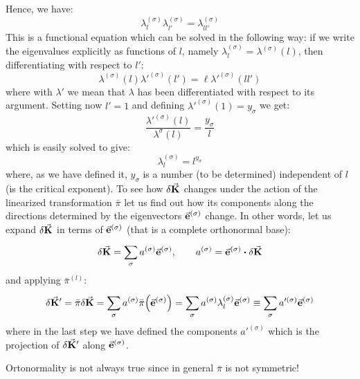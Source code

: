 \documentclass[../main/main.tex]{subfiles}
\begin{document}
Hence, we have:
\begin{equation}
  \lambda _l^{(\sigma )} \lambda _{l'}^{(\sigma )} =  \lambda _{ll'}^{(\sigma )}
  \label{eq:20_3}
\end{equation}
This is a functional equation which can be solved in the following way:  if we write the eigenvalues explicitly as functions of \( l \), namely \( \lambda _l^{(\sigma )}= \lambda^{(\sigma )}  (l)\), then differentiating with respect to \( l' \):
\begin{equation*}
   \lambda ^{(\sigma )}(l )\lambda '^{(\sigma )}(l')=\ell \lambda '^{(\sigma )}(l l ')
\end{equation*}
where with \( \lambda ' \)  we mean that \( \lambda  \)  has been differentiated with respect to its argument. Setting now \( l'=1 \)  and defining \( \lambda'^{(\sigma )} (1) = y_\sigma \)  we get:
\begin{equation*}
  \frac{\lambda'^{(\sigma )} (l)}{\lambda^\sigma (l)} = \frac{ y_\sigma}{l}
\end{equation*}
which is easily solved to give:
\begin{equation}
   \lambda _{l}^{(\sigma )} = l^{y_\sigma}
\end{equation}
where, as we have defined it, \( y_\sigma \) is a number (to be determined) independent of \( l \)  (is the critical exponent). To see how \( \delta \va{K} \) changes under the action of the linearized transformation  \( \bar{\pi }  \) let us find out how its components along the directions determined by the eigenvectors \( \va{e}^{(\sigma )} \) change.  In other words, let us expand \( \delta \va{K} \) in terms of \( \va{e}^{(\sigma )} \) (that is a complete orthonormal base):
\begin{equation}
  \delta \va{K} = \sum_{\sigma }^{} a^{(\sigma )} \va{e}^{(\sigma )}, \qquad a^{(\sigma )} = \va{e}^{(\sigma )} \vdot \delta \va{K}
\end{equation}
and applying \( \bar{\pi }^{(l)}  \):
\begin{equation}
  \delta \va{K}' = \bar{\pi } \delta \va{K} = \sum_{\sigma }^{} a^{(\sigma )} \bar{\pi } \qty(\va{e}^{(\sigma )})
  = \sum_{\sigma }^{} a^{(\sigma )} \lambda_l ^{(\sigma )} \va{e}^{(\sigma )}
  \equiv  \sum_{\sigma }^{} a'^{(\sigma )} \va{e}^{(\sigma )}
\end{equation}
where in the last step we have defined the components \( a'^{(\sigma )} \) which is the projection of \( \delta \va{K}' \) along \( \va{e}^{(\sigma )} \).
\begin{remark}
Ortonormality is not always true since in general \( \bar{\pi }  \) is not symmetric!
  \end{remark}
\end{document}
